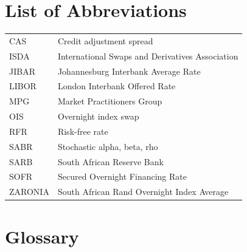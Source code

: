 \documentclass[12pt,final]{article}
\begin{document}
	

	\clearpage

	\renewcommand{\contentsname}{Table of Contents}
	\tableofcontents
	\newpage

	\renewcommand{\listfigurename}{List of Figures}
	\listoffigures

	\renewcommand{\listtablename}{List of Tables}
	\listoftables
	\newpage

	\section*{List of Abbreviations}

	\begin{tabular}{@{}ll@{}}
		CAS      & Credit adjustment spread \\
		ISDA     & International Swaps and Derivatives Association \\
		JIBAR    & Johannesburg Interbank Average Rate \\
		LIBOR    & London Interbank Offered Rate \\
		MPG      & Market Practitioners Group \\
		OIS      & Overnight index swap \\
		RFR      & Risk-free rate \\
		SABR     & Stochastic alpha, beta, rho \\
		SARB     & South African Reserve Bank \\
		SOFR     & Secured Overnight Financing Rate \\
		ZARONIA  & South African Rand Overnight Index Average \\
	\end{tabular}

	\newpage

	\section*{Glossary}
\end{document}
